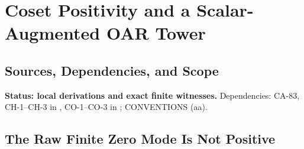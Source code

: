 
\section{Coset Positivity and a Scalar-Augmented OAR Tower}
\label{sec:coset-hamiltonian-and-oar}

\subsection{Sources, Dependencies, and Scope}

\textbf{Status: local derivations and exact finite witnesses.}
Dependencies: CA-83, CH-1--CH-3 in
, CO-1--CO-3 in
; CONVENTIONS (aa).


\subsection{The Raw Finite Zero Mode Is Not Positive}

